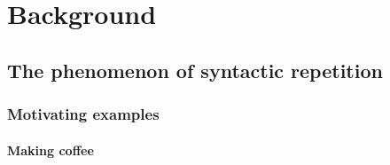 %
%
%






\setlength{\parindent}{0pt}
\setlength{\parskip}{0pt} %
% 
% 
% 
% 
% 

\cleardoublepage
{}
\tableofcontents

% 


\setlength{\parskip}{1em}


\mainmatter

\cleardoublepage
\part{Background}
\chapter{The phenomenon of syntactic repetition}
    \section{Motivating examples}
        \subsection{Making coffee} 
